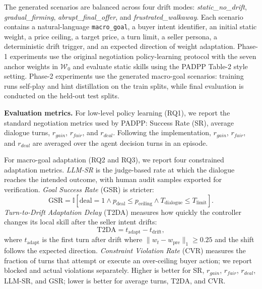 \documentclass[conference]{IEEEtran}
\begin{document}
The generated scenarios are balanced across four drift modes:
\textit{static\_no\_drift}, \textit{gradual\_firming},
\textit{abrupt\_final\_offer}, and \textit{frustrated\_walkaway}. Each scenario
contains a natural-language \texttt{macro\_goal}, a buyer intent identifier, an
initial static weight, a price ceiling, a target price, a turn limit, a seller
persona, a deterministic drift trigger, and an expected direction of weight
adaptation. Phase-1 experiments use the original negotiation policy-learning
protocol with the seven anchor weights in $\mathcal{W}_0$ and evaluate static
skills using the PADPP Table-2 style setting. Phase-2 experiments use the
generated macro-goal scenarios: training runs self-play and hint distillation on
the train splits, while final evaluation is conducted on the held-out test
splits.

\textbf{Evaluation metrics.}
For low-level policy learning (RQ1), we report the standard negotiation metrics
used by PADPP: Success Rate (SR), average dialogue turns, $r_{gain}$,
$r_{fair}$, and $r_{deal}$. Following the implementation, $r_{gain}$,
$r_{fair}$, and $r_{deal}$ are averaged over the agent decision turns in an
episode.

For macro-goal adaptation (RQ2 and RQ3), we report four constrained adaptation
metrics. \textit{LLM-SR} is the judge-based rate at which the dialogue reaches
the intended outcome, with human audit samples exported for verification.
\textit{Goal Success Rate} (GSR) is stricter:
\begin{equation}
    \mathrm{GSR} =
    \mathbb{I}[\mathrm{deal}=1
    \wedge p_{\mathrm{deal}}\le p_{\mathrm{ceiling}}
    \wedge T_{\mathrm{dialogue}}\le T_{\mathrm{limit}}].
\end{equation}
\textit{Turn-to-Drift Adaptation Delay} (T2DA) measures how quickly the
controller changes its local skill after the seller intent drifts:
\begin{equation}
    \mathrm{T2DA}=t_{\mathrm{adapt}}-t_{\mathrm{drift}},
\end{equation}
where $t_{\mathrm{adapt}}$ is the first turn after drift where
$\lVert w_t-w_{\mathrm{pre}}\rVert_1 \ge 0.25$ and the shift follows the
expected direction. \textit{Constraint Violation Rate} (CVR) measures the
fraction of turns that attempt or execute an over-ceiling buyer action; we
report blocked and actual violations separately. Higher is better for SR,
$r_{gain}$, $r_{fair}$, $r_{deal}$, LLM-SR, and GSR; lower is better for
average turns, T2DA, and CVR.
\end{document}
